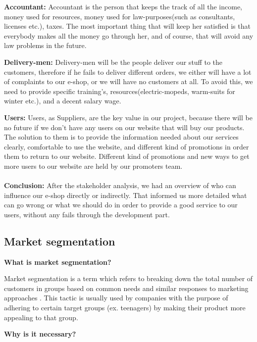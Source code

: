 \documentclass[12p]{article}
\begin{document}
\textbf{Accountant:}
Accountant is the person that keeps the track of all the income, money used for resources, money used for law-purposes(such as consultants, licenses etc.), taxes. The most important thing that will keep her satisfied is that everybody makes all the money go through her, and of course, that will avoid any law problems in the future.

\textbf{Delivery-men:}
Delivery-men will be the people deliver our stuff to the customers, therefore if he fails to deliver different orders, we either will have a lot of complaints to our e-shop, or we will have no customers at all. To avoid this, we need to provide specific training's, resources(electric-mopeds, warm-suits for winter etc.), and a decent salary wage.

\textbf{Users:}
Users, as Suppliers, are the key value in our project, because there will be no future if we don't have any users on our website that will buy our products. The solution to them is to provide the information needed about our services clearly, comfortable to use the website, and different kind of promotions in order them to return to our website. Different kind of promotions and new ways to get more users to our website are held by our promoters team.
\\
\\
\textbf{Conclusion:}
After the stakeholder analysis, we had an overview of who can influence our e-shop directly or indirectly. That informed us more detailed what can go wrong or what we should do in order to provide a good service to our users, without any fails through the development part.

\newpage


\subsection{Market segmentation} \label{MarketSegmentation}

\textbf{What is market segmentation?}

Market segmentation is a term which refers to breaking down the total number of customers in groups based on common needs and similar responses to marketing approaches \cite{MarketSegmentation}. This tactic is usually used by companies with the purpose of adhering to certain target groups (ex. teenagers) by making their product more appealing to that group.

\textbf{Why is it necessary?}
\end{document}
